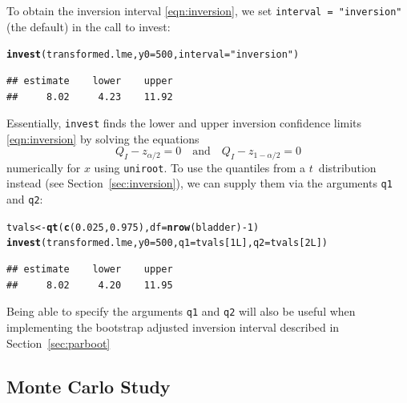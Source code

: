 \documentclass{article}\usepackage[]{graphicx}\usepackage[]{color}
\makeatletter
\newcommand{\hlnum}[1]{\textcolor[rgb]{0.686,0.059,0.569}{#1}}%
\newcommand{\hlstr}[1]{\textcolor[rgb]{0.192,0.494,0.8}{#1}}%
\newcommand{\hlopt}[1]{\textcolor[rgb]{0,0,0}{#1}}%
\newcommand{\hlstd}[1]{\textcolor[rgb]{0.345,0.345,0.345}{#1}}%
\newcommand{\hlkwb}[1]{\textcolor[rgb]{0.69,0.353,0.396}{#1}}%
\newcommand{\hlkwc}[1]{\textcolor[rgb]{0.333,0.667,0.333}{#1}}%
\newcommand{\hlkwd}[1]{\textcolor[rgb]{0.737,0.353,0.396}{\textbf{#1}}}%
\newenvironment{kframe}{%
 \def\at@end@of@kframe{}%
 \ifinner\ifhmode%
  \def\at@end@of@kframe{\end{minipage}}%
  \begin{minipage}{\columnwidth}%
 \fi\fi%
 \def\FrameCommand##1{\hskip\@totalleftmargin \hskip-\fboxsep
 \colorbox{shadecolor}{##1}\hskip-\fboxsep
     \hskip-\linewidth \hskip-\@totalleftmargin \hskip\columnwidth}%
 \MakeFramed {\advance\hsize-\width
   \@totalleftmargin\z@ \linewidth\hsize
   \@setminipage}}%
 {\par\unskip\endMakeFramed%
 \at@end@of@kframe}
\newenvironment{knitrout}{}{} %
\makeatother
\begin{document}
To obtain the inversion interval \eqref{eqn:inversion}, we set \texttt{interval = "inversion"} (the default) in the call to invest:
\begin{knitrout}
\color{fgcolor}\begin{kframe}
\begin{alltt}
\hlkwd{invest}\hlstd{(transformed.lme,} \hlkwc{y0} \hlstd{=} \hlnum{500}\hlstd{,} \hlkwc{interval} \hlstd{=} \hlstr{"inversion"}\hlstd{)}
\end{alltt}
\begin{verbatim}
## estimate    lower    upper 
##     8.02     4.23    11.92
\end{verbatim}
\end{kframe}
\end{knitrout}
Essentially, \texttt{invest} finds the lower and upper inversion confidence limits \eqref{eqn:inversion} by solving the equations
\begin{equation*}
  Q_I - z_{\alpha/2} = 0 \quad \text{and} \quad Q_I - z_{1-\alpha/2} = 0
\end{equation*}
numerically for $x$ using \texttt{uniroot}. To use the quantiles from a $t$~distribution instead (see Section~\ref{sec:inversion}), we can supply them via the arguments \texttt{q1} and \texttt{q2}:
\begin{knitrout}
\color{fgcolor}\begin{kframe}
\begin{alltt}
\hlstd{tvals} \hlkwb{<-} \hlkwd{qt}\hlstd{(}\hlkwd{c}\hlstd{(}\hlnum{0.025}\hlstd{,} \hlnum{0.975}\hlstd{),} \hlkwc{df} \hlstd{=} \hlkwd{nrow}\hlstd{(bladder)} \hlopt{-} \hlnum{1}\hlstd{)}
\hlkwd{invest}\hlstd{(transformed.lme,} \hlkwc{y0} \hlstd{=} \hlnum{500}\hlstd{,} \hlkwc{q1} \hlstd{= tvals[}\hlnum{1L}\hlstd{],} \hlkwc{q2} \hlstd{= tvals[}\hlnum{2L}\hlstd{])}
\end{alltt}
\begin{verbatim}
## estimate    lower    upper 
##     8.02     4.20    11.95
\end{verbatim}
\end{kframe}
\end{knitrout}
Being able to specify the arguments \texttt{q1} and \texttt{q2} will also be useful when implementing the bootstrap adjusted inversion interval described in Section~\ref{sec:parboot}


\subsection{Monte Carlo Study}
\end{document}
